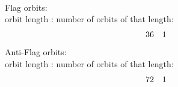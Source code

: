 \\
Flag orbits:\\
orbit length : number of orbits of that length:\\
$$
\begin{array}{*{2}c}
36  & 1\\
\end{array}
$$
Anti-Flag orbits:\\
orbit length : number of orbits of that length:\\
$$
\begin{array}{*{2}c}
72  & 1\\
\end{array}
$$
